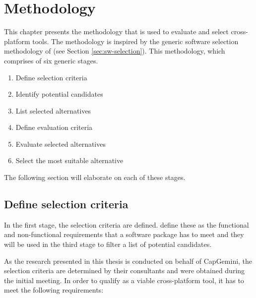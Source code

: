 \chapter{Methodology}
\label{chap:methodology}

This chapter presents the methodology that is used to evaluate and select cross-platform tools. The methodology is inspired by the generic software selection methodology of \citet{Jadhav:2011}  (see Section \ref{sec:sw-selection}). This methodology, which comprises of six generic stages.

\begin{enumerate}
    \item Define selection criteria
    \item Identify potential candidates
    \item List selected alternatives
    \item Define evaluation criteria
    \item Evaluate selected alternatives
    \item Select the most suitable alternative
\end{enumerate}

The following section will elaborate on each of these stages.

\section{Define selection criteria}
\label{sec:selection-criteria}

In the first stage, the selection criteria are defined. \citet{Jadhav:2011} define these as the functional and non-functional requirements that a software package has to meet and they will be used in the third stage to filter a list of potential candidates. 

As the research presented in this thesis is conducted on behalf of CapGemini, the selection criteria are determined by their consultants and were obtained during the initial meeting. In order to qualify as a viable cross-platform tool, it has to meet the following requirements:

